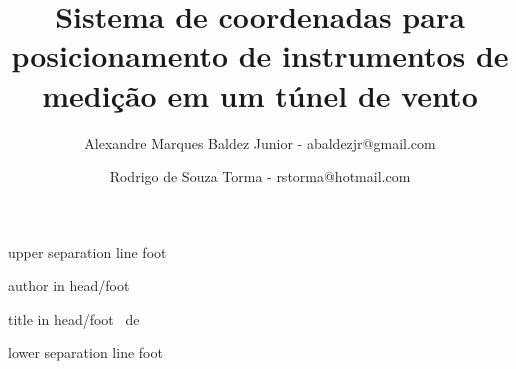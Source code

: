\usepackage[utf8]{inputenc}
\usepackage{amsmath,amssymb}
\usepackage[brazil]{varioref}
\usepackage[english,brazil]{babel}
\usepackage{graphicx}
\usepackage{listings}
\usepackage{url}
\usepackage{colortbl}
\usepackage{setspace}
\usepackage{multimedia}



\beamertemplatetransparentcovereddynamic
\newcommand{\frameofframes}{/}
\newcommand{\setframeofframes}[1]{\renewcommand{\frameofframes}{#1}}
\setframeofframes{de}
\makeatletter
{}
  {%
    \begin{beamercolorbox}[colsep=1.5pt]{upper separation line foot}
    \end{beamercolorbox}
    \begin{beamercolorbox}[ht=2.5ex,dp=1.125ex,%
      leftskip=.3cm,rightskip=.3cm plus1fil]{author in head/foot}%
      \hfill%
      {\insertshortinstitute}%
    \end{beamercolorbox}%
    \begin{beamercolorbox}[ht=2.5ex,dp=1.125ex,%
      leftskip=.3cm,rightskip=.3cm plus1fil]{title in head/foot}%
      {\insertshorttitle}%
      \hfill%
      {\insertframenumber~\frameofframes~\inserttotalframenumber}
    \end{beamercolorbox}%
    \begin{beamercolorbox}[colsep=1.5pt]{lower separation line foot}
    \end{beamercolorbox}
  }
\makeatother
\title[Sistema de coordenadas para posicionamento de instrumentos de medição em um túnel de vento]
{\normalsize Sistema de coordenadas para posicionamento de instrumentos de medição em um túnel de vento}
\author[Baldez Jr, Torma]{Alexandre Marques Baldez Junior - abaldezjr@gmail.com \and Rodrigo de Souza Torma - rstorma@hotmail.com}

